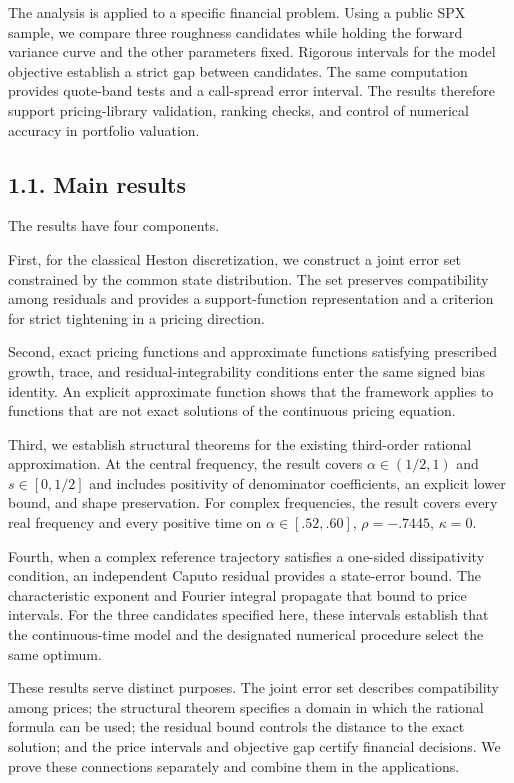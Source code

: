 \documentclass[a4paper,11pt]{article}
\begin{document}
The analysis is applied to a specific financial problem. Using a public SPX sample, we compare three roughness candidates while holding the forward variance curve and the other parameters fixed. Rigorous intervals for the model objective establish a strict gap between candidates. The same computation provides quote-band tests and a call-spread error interval. The results therefore support pricing-library validation, ranking checks, and control of numerical accuracy in portfolio valuation.

\subsection*{1.1. Main results}

The results have four components.

First, for the classical Heston discretization, we construct a joint error set constrained by the common state distribution. The set preserves compatibility among residuals and provides a support-function representation and a criterion for strict tightening in a pricing direction.

Second, exact pricing functions and approximate functions satisfying prescribed growth, trace, and residual-integrability conditions enter the same signed bias identity. An explicit approximate function shows that the framework applies to functions that are not exact solutions of the continuous pricing equation.

Third, we establish structural theorems for the existing third-order rational approximation. At the central frequency, the result covers \(\alpha\in(1/2,1)\) and \(s\in[0,1/2]\) and includes positivity of denominator coefficients, an explicit lower bound, and shape preservation. For complex frequencies, the result covers every real frequency and every positive time on \(\alpha\in[.52,.60]\), \(\rho=-.7445\), \(\kappa=0\).

Fourth, when a complex reference trajectory satisfies a one-sided dissipativity condition, an independent Caputo residual provides a state-error bound. The characteristic exponent and Fourier integral propagate that bound to price intervals. For the three candidates specified here, these intervals establish that the continuous-time model and the designated numerical procedure select the same optimum.

These results serve distinct purposes. The joint error set describes compatibility among prices; the structural theorem specifies a domain in which the rational formula can be used; the residual bound controls the distance to the exact solution; and the price intervals and objective gap certify financial decisions. We prove these connections separately and combine them in the applications.
\end{document}
